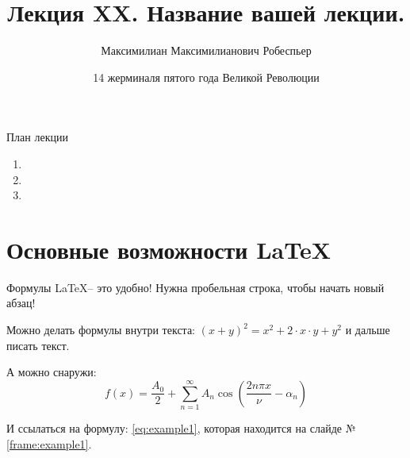 


\title{Лекция XX. Название вашей лекции.}
\date{14 жерминаля пятого года Великой Революции}
\author{Максимилиан Максимилианович Робеспьер}



  \maketitle
    
  \begin{frame}{План лекции}\label{frame:plan}
    \begin{enumerate}
	\item {}
	\item {}
	\item {}
	\end{enumerate}
 \end{frame}
    
    
\section{Основные возможности \LaTeX}\label{section:main_latex_opportunity}

\begin{frame}{Формулы}\label{frame:example1}
   \LaTeX -- это удобно!
   Нужна
   пробельная
   строка,
   чтобы
   начать новый абзац!
   
   Можно делать формулы внутри текста: $(x+y)^2=x^2 + 2 \cdot x \cdot y + y^2$ и дальше писать
   текст.
   
   А можно снаружи:
   \begin{equation}\label{eq:example1}
   	f(x) = \frac{A_0}{2} + \sum \limits_{n=1}^{\infty} A_n \cos \left( \frac{2 n \pi x}{\nu} - \alpha_n \right) 
   \end{equation}
   
   И ссылаться на формулу: \eqref{eq:example1}, 
   которая находится на слайде №\ref{frame:example1}.  
\end{frame}

